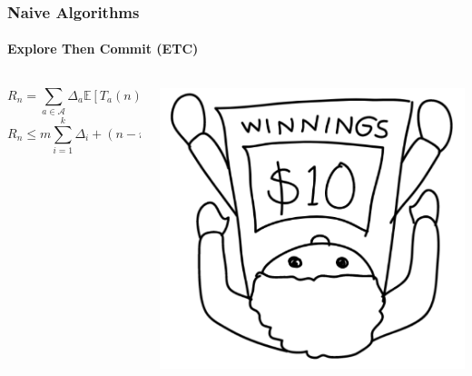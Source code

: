 \documentclass[12pt, aspectratio=169, mathserif]{beamer}
\begin{document}
  \begin{frame}
    \frametitle{Naive Algorithms}
    \framesubtitle{Explore Then Commit (ETC)}
    \begin{columns}
      \begin{column}{0.7\textwidth}
        \begin{equation*}
          R_n = \sum_{a \in \mathcal{A}}\Delta_a\mathbb{E}[T_a(n)]
        \end{equation*}
        \begin{equation*}
          R_n \leq m\sum_{i = 1}^k\Delta_i + (n -mk)\sum_{i = 1}^k\Delta_i\exp\left(-\frac{m\Delta_i^2}{4}\right)
        \end{equation*}
      \end{column}
      \begin{column}{0.3\textwidth}
        \includegraphics[width=\textwidth]{Screenshot from 2023-07-12 13-50-37.png}
      \end{column}
    \end{columns}
  \end{frame}
\end{document}
